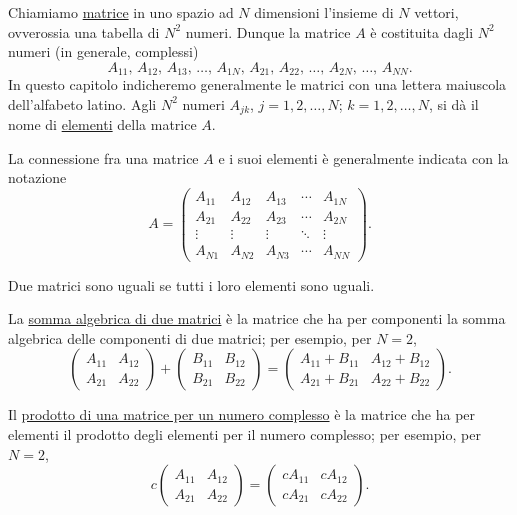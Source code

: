 \documentclass[11pt, a4paper]{book}
\numberwithin{equation}{section}
\begin{document}
Chiamiamo \uline{matrice} in uno spazio ad $N$ dimensioni l'insieme di $N$ vettori, ovverossia una tabella di $N^2$ numeri. Dunque la matrice $A$ è costituita dagli $N^2$ numeri (in generale, complessi)
\[
    A_{11},\, A_{12},\, A_{13},\, \ldots,\, A_{1N},\, A_{21},\, A_{22},\, \ldots,\, A_{2N},\, \ldots,\, A_{NN}.
\]
In questo capitolo indicheremo generalmente le matrici con una lettera maiuscola dell'alfabeto latino. Agli $N^2$ numeri $A_{jk}$, $j = 1,2,\ldots,N$; $k = 1,2,\ldots,N$, si dà il nome di \uline{elementi} della matrice $A$.

La connessione fra una matrice $A$ e i suoi elementi è generalmente indicata con la notazione
\[
A =
\begin{pmatrix}
A_{11} & A_{12} & A_{13} & \cdots & A_{1N} \\
A_{21} & A_{22} & A_{23} & \cdots & A_{2N} \\
\vdots & \vdots & \vdots & \ddots & \vdots \\
A_{N1} & A_{N2} & A_{N3} & \cdots & A_{NN}
\end{pmatrix}.
\]

Due matrici sono uguali se tutti i loro elementi sono uguali.

La \uline{somma algebrica di due matrici} è la matrice che ha per componenti la somma algebrica delle componenti di due matrici; per esempio, per $N = 2$,
\[
\begin{pmatrix} A_{11} & A_{12} \\ A_{21} & A_{22} \end{pmatrix}
+
\begin{pmatrix} B_{11} & B_{12} \\ B_{21} & B_{22} \end{pmatrix}
=
\begin{pmatrix} A_{11} + B_{11} & A_{12} + B_{12} \\ A_{21} + B_{21} & A_{22} + B_{22} \end{pmatrix}.
\]

Il \uline{prodotto di una matrice per un numero complesso} è la matrice che ha per elementi il prodotto degli elementi per il numero complesso; per esempio, per $N = 2$,
\[
c
\begin{pmatrix} A_{11} & A_{12} \\ A_{21} & A_{22} \end{pmatrix}
=
\begin{pmatrix} cA_{11} & cA_{12} \\ cA_{21} & cA_{22} \end{pmatrix}.
\]
\end{document}
